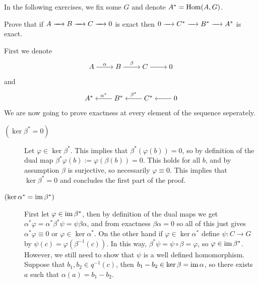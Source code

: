\documentclass[11pt,a4paper]{article}
\begin{document}
\begin{remark}
  In the following exercises, we fix some $G$ and denote $A^* = \operatorname{Hom}(A,G)$.
\end{remark}

\begin{exercise}
  \label{ex:exact-sequences}
  Prove that if $A \xrightarrow{\quad} B \xrightarrow{\quad} C \xrightarrow{\quad} 0$
  is exact then $0 \xrightarrow{\quad} C^* \xrightarrow{\quad} B^* \xrightarrow{\quad} A^*$
  is exact.
\end{exercise}
\begin{solution}
  First we denote
  \[\begin{tikzcd}[ampersand replacement=\&,cramped]
    A \& B \& C \& 0
    \arrow["\alpha", from=1-1, to=1-2]
    \arrow["\beta", from=1-2, to=1-3]
    \arrow[from=1-3, to=1-4]
  \end{tikzcd}\]
  and
  \[\begin{tikzcd}[ampersand replacement=\&,cramped]
    {A^*} \& {B^*} \& {C^*} \& 0
    \arrow["{\alpha^*}"', from=1-2, to=1-1]
    \arrow["{\beta^*}"', from=1-3, to=1-2]
    \arrow[from=1-4, to=1-3]
  \end{tikzcd}\]
  We are now going to prove exactness at every element of
  the sequence seperately.
  \begin{description}
    \item[$(\ker \beta^* = 0)$]
      Let $\varphi \in \ker \beta^*$.
      This implies that $\beta^*(\varphi(b)) = 0$,
      so by definition of the dual map
      $\beta^* \varphi(b) := \varphi(\beta (b)) = 0$.
      This holds for all $b$, and by assumption $\beta$ is surjective,
      so necessarily $\varphi \equiv 0$.
      This implies that $\ker \beta^* = 0$ and concludes the first part
      of the proof.
    \item[$(\ker \alpha^* = \operatorname{im} \beta^*)$]
      First let $\varphi \in \operatorname{im} \beta^*$,
      then by definition of the dual maps
      we get $\alpha^* \varphi = \alpha^* \beta^* \psi = \psi \beta \alpha$,
      and from exactness $\beta \alpha = 0$
      so all of this just gives $\alpha^* \varphi \equiv 0$
      or $\varphi \in \ker \alpha^*$.
      On the other hand if $\varphi \in \ker \alpha^*$
      define $\psi \colon C \to G$ by $\psi(c) = \varphi(\beta^{-1}(c))$.
      In this way, $\beta^* \psi = \psi \circ \beta = \varphi$,
      so $\varphi \in \operatorname{im} \beta^*$.
      However, we still need to show that $\psi$ is a well defined
      homomorphism.
      Suppose that $b_1,b_2 \in q^{-1}(c)$,
      then $b_1 - b_2 \in \ker \beta = \operatorname{im} \alpha$,
      so there exists $a$ such that $\alpha(a) = b_1 - b_2$.

\end{description}
\end{solution}
\end{document}
